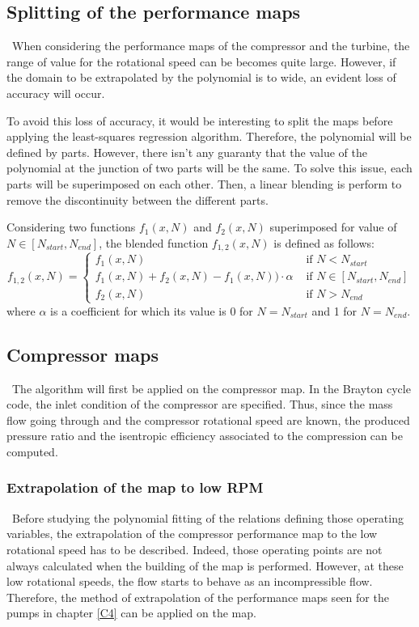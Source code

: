 \subsection{Splitting of the performance maps}
\quad\ When considering the performance maps of the compressor and the turbine, the range of value for the rotational speed can be becomes quite large. However, if the domain to be extrapolated by the polynomial is to wide, an evident loss of accuracy will occur. 

To avoid this loss of accuracy, it would be interesting to split the maps before applying the least-squares regression algorithm. Therefore, the polynomial will be defined by parts. However, there isn't any guaranty that the value of the polynomial at the junction of two parts will be the same. To solve this issue, each parts will be superimposed on each other. Then, a linear blending is perform to remove the discontinuity between the different parts. 

Considering two functions $f_1(x,N)$ and $f_2(x,N)$ superimposed for value of $N\in [N_{start},N_{end}]$, the blended function $f_{1,2}(x,N)$ is defined as follows:
\begin{equation}
 f_{1,2}(x,N) = \begin{cases}
f_1(x,N) &\text{ if }N<N_{start}\\
f_1(x,N) + f_2(x,N) - f_1(x,N))\cdot \alpha &\text{ if } N\in [N_{start},N_{end}]\\
f_2(x,N) &\text{ if }N>N_{end}
\end{cases}   
\end{equation}
where $\alpha$ is a coefficient for which its value is 0 for $N = N_{start}$ and 1 for $N = N_{end}$.  
\subsection{Compressor maps}
\quad\ The algorithm will first be applied on the compressor map. In the Brayton cycle code, the inlet condition of the compressor are specified. Thus, since the mass flow going through and the compressor rotational speed are known, the produced pressure ratio and the isentropic efficiency associated to the compression can be computed.

\subsubsection{Extrapolation of the map to low RPM}
\quad\, Before studying the polynomial fitting of the relations defining those operating variables, the extrapolation of the compressor performance map to the low rotational speed has to be described. Indeed, those operating points are not always calculated when the building of the map is performed. However, at these low rotational speeds, the flow starts to behave as an incompressible flow. Therefore, the method of extrapolation of the performance maps seen for the pumps in chapter \ref{C4} can be applied on the map.

